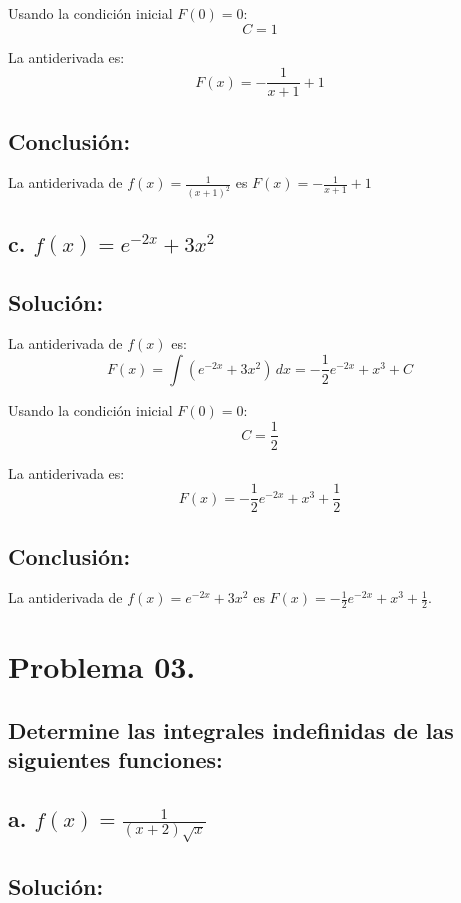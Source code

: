 \documentclass{article}
\begin{document}
\noindent Usando la condición inicial \( F(0) = 0 \):
\[
C = 1
\]

\noindent La antiderivada es:
\[
F(x) = -\frac{1}{x+1} + 1
\]

\subsection*{Conclusión:}

La antiderivada de \( f(x) = \frac{1}{(x+1)^2} \) es \( F(x) = -\frac{1}{x+1} + 1 \)

\subsection*{\newline c. \(f(x) = e^{-2x} + 3x^2\)}
\subsection*{Solución: }

La antiderivada de \( f(x) \) es:
\[
F(x) = \int (e^{-2x} + 3x^2) \, dx = -\frac{1}{2}e^{-2x} + x^3 + C
\]

\noindent Usando la condición inicial \( F(0) = 0 \):
\[
C = \frac{1}{2}
\]

\noindent La antiderivada es:
\[
F(x) = -\frac{1}{2}e^{-2x} + x^3 + \frac{1}{2}
\]

\subsection*{Conclusión:}

La antiderivada de \( f(x) = e^{-2x} + 3x^2 \) es \( F(x) = -\frac{1}{2}e^{-2x} + x^3 + \frac{1}{2} \).

\section*{Problema 03.}

\subsection*{Determine las integrales indefinidas de las siguientes funciones:}

\subsection*{\newline a. \(f(x) = \frac{1}{(x+2)\sqrt{x}}\)}
\subsection*{Solución: }
\end{document}
